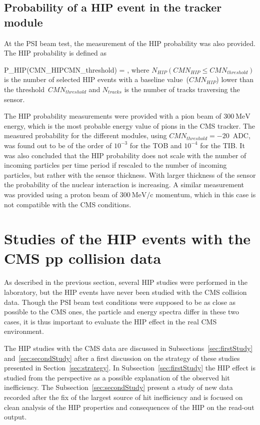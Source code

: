 \subsection{Probability of a HIP event in the tracker module~\label{sec:ProbPast}}

At the PSI beam test, the measurement of the HIP probability was also provided. The HIP probability is defined as 

{
P_{HIP}(CMN_{HIP}\leq CMN_{threshold}) = ,
}
where $N_{HIP}(CMN_{HIP}\leq CMN_{threshold})$ is the number of selected HIP events with a baseline value~($CMN_{HIP}$) lower than the threshold~$CMN_{threshold}$ and $N_{tracks}$ is the number of tracks traversing the sensor.

The HIP probability measurements were provided with a pion beam of $300~\mathrm{MeV}$ energy, which is the most probable energy value of pions in the CMS tracker. The measured probability for the different modules, using $CMN_{threshold}=-20$~ADC, was found out to be of the order of $10^{-3}$ for the TOB and $10^{-4}$ for the TIB. It was also concluded that the HIP probability does not scale with the number of incoming particles per time period if rescaled to the number of incoming particles, but rather with the sensor thickness. With larger thickness of the sensor the probability of the nuclear interaction is increasing.  A similar measurement was provided using a proton beam of  $300~\mathrm{MeV/c}$ momentum, which in this case is not compatible with the CMS conditions.

\newpage

\section{Studies of the HIP events with the CMS pp collision data}

As described in the previous section, several HIP studies were performed in the laboratory, but the HIP events have never been studied with the CMS collision data. Though the PSI beam test conditions were supposed to be as close as possible to the CMS ones, the particle and energy spectra differ in these two cases, it is thus important to evaluate the HIP effect in the real CMS environment.

The HIP studies with the CMS data are discussed in Subsections~\ref{sec:firstStudy} and~\ref{sec:secondStudy} after a first discussion on the strategy of these studies presented in Section~\ref{sec:strategy}. In Subsection~\ref{sec:firstStudy} the HIP effect is studied from the perspective as a possible explanation of the observed hit inefficiency. The Subsection~\ref{sec:secondStudy} present a study of new data recorded after the fix of the largest source of hit inefficiency and is focused on clean analysis of the HIP properties and consequences of the HIP on the read-out output.


